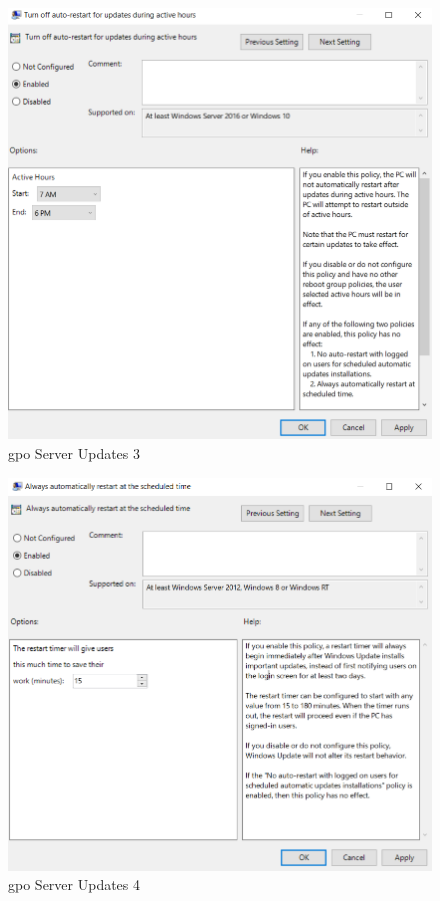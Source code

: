 \begin{minipage}{0.5\linewidth}
    \begin{figure}[H]
        \centering
        \includegraphics[width=\linewidth]{../img/Updates/client-auto-restart-during-working-hours.png}
        \caption{\acrshort{gpo} Server Updates 3}
    \end{figure}
\end{minipage}
\begin{minipage}{0.5\linewidth}
    \begin{figure}[H]
        \centering
        \includegraphics[width=\linewidth]{../img/Updates/server-automatic-restart.png}
        \caption{\acrshort{gpo} Server Updates 4}
    \end{figure}
\end{minipage}\\

